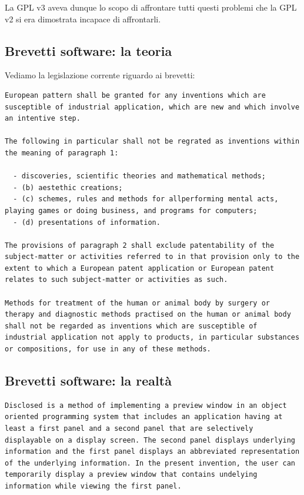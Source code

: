La GPL v3 aveva dunque lo scopo di affrontare tutti questi problemi che la GPL v2 si era dimostrata incapace di affrontarli. 

\subsection{Brevetti software: la teoria}

Vediamo la legislazione corrente riguardo ai brevetti:

\begin{lstlisting}
European pattern shall be granted for any inventions which are susceptible of industrial application, which are new and which involve an intentive step.

The following in particular shall not be regrated as inventions within the meaning of paragraph 1:

  - discoveries, scientific theories and mathematical methods;
  - (b) aestethic creations;
  - (c) schemes, rules and methods for allperforming mental acts, playing games or doing business, and programs for computers;
  - (d) presentations of information.

The provisions of paragraph 2 shall exclude patentability of the subject-matter or activities referred to in that provision only to the extent to which a European patent application or European patent relates to such subject-matter or activities as such.

Methods for treatment of the human or animal body by surgery or therapy and diagnostic methods practised on the human or animal body shall not be regarded as inventions which are susceptible of industrial application not apply to products, in particular substances or compositions, for use in any of these methods.

\end{lstlisting}

\subsection{Brevetti software: la realtà}

\begin{lstlisting}
Disclosed is a method of implementing a preview window in an object oriented programming system that includes an application having at least a first panel and a second panel that are selectively displayable on a display screen. The second panel displays underlying information and the first panel displays an abbreviated representation of the underlying information. In the present invention, the user can temporarily display a preview window that contains undelying information while viewing the first panel.

\end{lstlisting}

